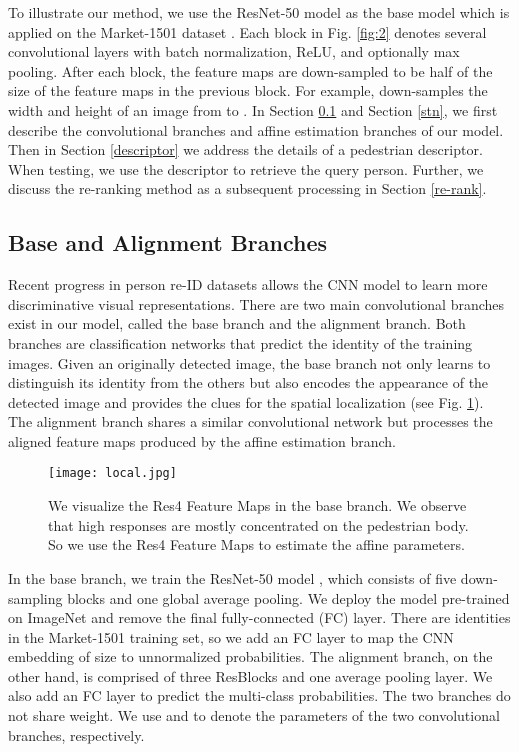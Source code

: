 To illustrate our method, we use the ResNet-50 model \cite{he2016deep} as the base model which is applied on the Market-1501 dataset \cite{zheng2015scalable}. 
Each  block in Fig. \ref{fig:2} denotes several convolutional layers with batch normalization, ReLU, and optionally max pooling. After each block, the feature maps are down-sampled to be half of the size of the feature maps in the previous block. For example,  down-samples the  width and height of an image from  to .
In Section \ref{conv} and Section \ref{stn}, we first describe the convolutional branches and affine estimation branches of our model. Then in Section \ref{descriptor} we address the details of a pedestrian descriptor. When testing, we use the descriptor to retrieve the query person. Further, we discuss the re-ranking method as a subsequent processing in Section \ref{re-rank}.

\subsection{Base and Alignment Branches} \label{conv}
Recent progress in person re-ID datasets allows the CNN model to learn more discriminative visual representations. There are two main convolutional branches exist in our model, called the base branch and the alignment branch. Both branches are classification networks that predict the identity of the training images. Given an originally detected image, the base branch not only learns to distinguish its identity from the others but also encodes the appearance of the detected image and provides the clues for the spatial localization (see Fig. \ref{fig:feature_map}). The alignment branch shares a similar convolutional network but processes the aligned feature maps produced by the affine estimation branch.

\begin{figure}[t]
\begin{center}
\texttt{[image: local.jpg]}
\end{center}
   \caption{We visualize the Res4 Feature Maps in the base branch. We observe that high responses are mostly concentrated on the pedestrian body. So we use the Res4 Feature Maps to estimate the affine parameters.}
\label{fig:feature_map}
\end{figure}
In the base branch, we train the ResNet-50 model \cite{he2016deep}, which consists of five down-sampling blocks and one global average pooling. We deploy the model pre-trained on ImageNet \cite{deng2009imagenet} and remove the final fully-connected (FC) layer. There are  identities in the Market-1501 training set, so we add an FC layer to map the CNN embedding of size  to  unnormalized probabilities. The alignment branch, on the other hand, is comprised of three ResBlocks and one average pooling layer. We also add an FC layer to predict the multi-class probabilities. The two branches do not share weight. We use  and  to denote the parameters of the two convolutional branches, respectively.

